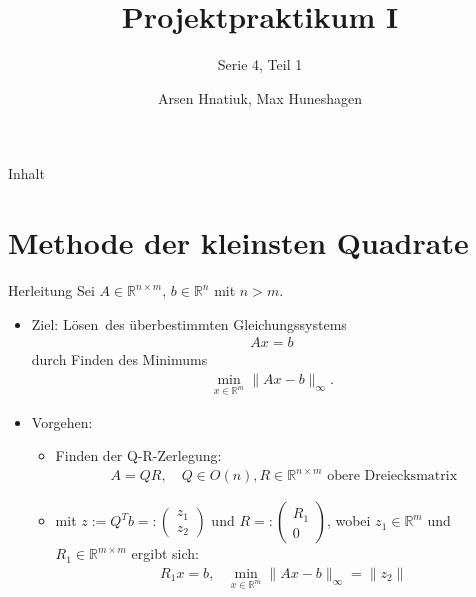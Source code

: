 \documentclass{beamer}
\title{Projektpraktikum I}
\subtitle{Serie 4, Teil 1}
\author{Arsen Hnatiuk, Max Huneshagen}
\begin{document}
\begin{frame}
  \maketitle
\end{frame}

\begin{frame}{Inhalt}
  \tableofcontents
\end{frame}

\section{Methode der kleinsten Quadrate}

\begin{frame}{Herleitung}
  Sei $A\in \mathbb{R}^{n\times m}$,  $b\in \mathbb{R}^n$ mit $n>m$.\\
  \begin{itemize}
  \item Ziel: \glqq Lösen\grqq ~des überbestimmten Gleichungssystems 
  \begin{align}
  Ax=b
  \end{align}
  durch Finden des Minimums
  \begin{align}
  \min\limits_{x\in\mathbb{R}^m}\|Ax-b\|_\infty.
  \end{align}
\item Vorgehen:
\begin{itemize}
\item Finden der Q-R-Zerlegung:
\begin{align}
A=QR, \text{~~~}Q\in  O(n), R\in \mathbb{R}^{n\times m}\text{ obere Dreiecksmatrix}
\end{align}
\item mit $z:=Q^Tb=:
\begin{pmatrix}
z_1\\
\hline
z_2
\end{pmatrix}$ und $R=:\begin{pmatrix}
R_1\\
0
\end{pmatrix}$, wobei $z_1\in\mathbb{R}^{m}$ und $R_1\in\mathbb{R}^{m\times m}$ ergibt sich:
\begin{align}
R_1x=b\text{,~~~}  \min\limits_{x\in\mathbb{R}^m}\|Ax-b\|_\infty=\|z_2\|
\end{align}

\end{itemize}
  \end{itemize}
  



\end{frame}
\end{document}
